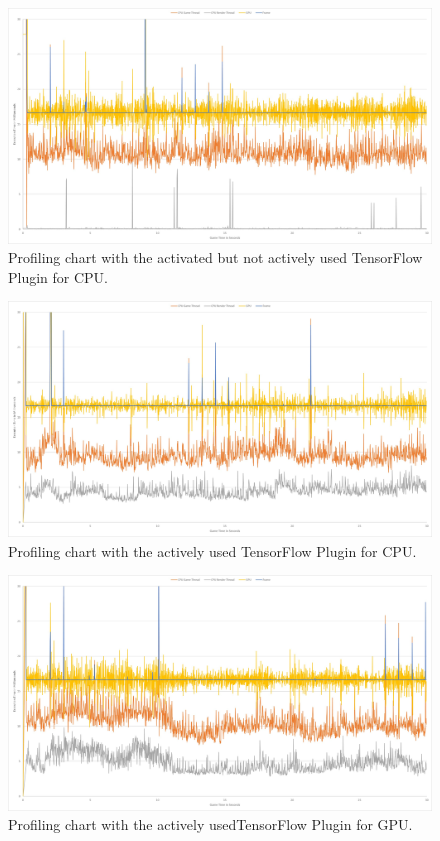 \documentclass[MGS,Master,english]{twbook}%
\begin{document}
\begin{figure}[!htbp]
	\centering
	\includegraphics[width=1.0\linewidth]{PICs/Profiling/activated_plugin_no_tf_used}
	\caption{Profiling chart with the activated but not actively used TensorFlow Plugin for CPU.}
\end{figure}

\begin{figure}[!htbp]
	\centering
	\includegraphics[width=1.0\linewidth]{PICs/Profiling/tf_cpu}
	\caption{Profiling chart with the actively used TensorFlow Plugin for CPU.}
\end{figure}

\begin{figure}[!htbp]
	\centering
	\includegraphics[width=1.0\linewidth]{PICs/Profiling/tf_gpu}
	\caption{Profiling chart with the actively usedTensorFlow Plugin for GPU.}
\end{figure}
\end{document}
